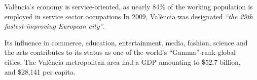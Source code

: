 \documentclass{article}
\begin{document}

Val\`{e}ncia's economy is service-oriented, as nearly 84\% of the working population
is employed in service sector occupations In 2009, Val\`{e}ncia was designated \emph{``the
29th fastest-improving European city''}.  

Its influence in commerce, education, entertainment, media, fashion, science
and the arts contributes to its status as one of the world's ``Gamma''-rank
global cities. The Val\`{e}ncia metropolitan area had a GDP amounting to \$52.7
billion, and \$28,141 per capita.
\end{document}

